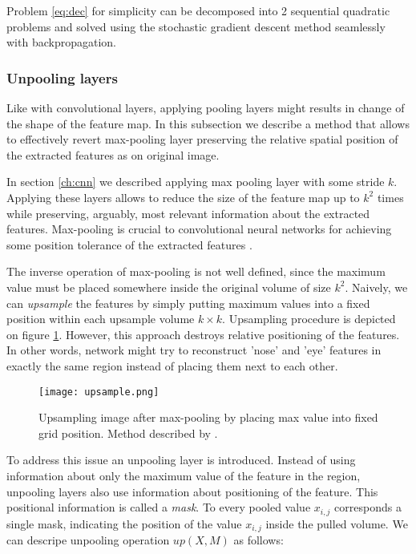Problem \ref{eq:dec} for simplicity can be decomposed into 2 sequential quadratic problems and solved using the stochastic gradient descent method seamlessly with backpropagation.

\subsubsection{Unpooling layers}

Like with convolutional layers, applying pooling layers might results in change of the shape of the feature map.
In this subsection we describe a method that allows to effectively revert max-pooling layer preserving the relative spatial position of the extracted features as on original image.

In section \ref{ch:cnn} we described applying max pooling layer with some stride $k$.
Applying these layers allows to reduce the size of the feature map up to $k^2$ times while preserving, arguably, most relevant information about the extracted features.
Max-pooling is crucial to convolutional neural networks for achieving some position tolerance of the extracted features \cite{Jaderberg2015}.

The inverse operation of max-pooling is not well defined, since the maximum value must be placed somewhere inside the original volume of size $k^2$. Naively, we can \textit{upsample} the features by simply putting maximum values into a fixed position within each upsample volume $k \times k$.
Upsampling procedure is depicted on figure \ref{fig:pool}.
However, this approach destroys relative positioning of the features.
In other words, network might try to reconstruct 'nose' and 'eye' features in exactly the same region instead of placing them next to each other.

\begin{figure}[h!]
  \centering
    \texttt{[image: upsample.png]}
  \caption{Upsampling image after max-pooling by placing max value into fixed grid position. Method described by \cite{Dosovitskiy2015a}.}
  \label{fig:pool}
\end{figure}

To address this issue an unpooling layer is introduced. Instead of using information about only the maximum value of the feature in the region, unpooling layers also use information about positioning of the feature. This positional information is called a \textit{mask}. To every pooled value $x_{i,j}$ corresponds a single mask, indicating the position of the value $x_{i,j}$ inside the pulled volume. We can descripe unpooling operation $up(X, M)$ as follows:

